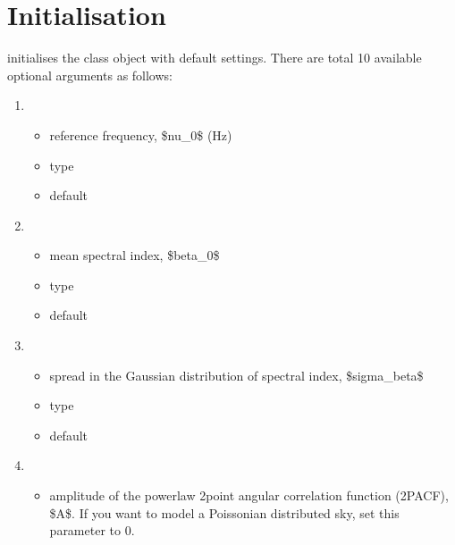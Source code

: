 \documentclass[letterpaper,10pt,english]{sphinxmanual}
\begin{document}
\section{Initialisation}
\label{\detokenize{detexp:initialisation}}
\sphinxAtStartPar
{} initialises the class object with default settings.
There are total 10 available optional arguments as follows:
\begin{enumerate}
%
\item {} 
\sphinxAtStartPar
{}
\begin{itemize}
\item {} 
\sphinxAtStartPar
reference frequency, \$nu\_0\$ (Hz)

\item {} 
\sphinxAtStartPar
type 

\item {} 
\sphinxAtStartPar
default 

\end{itemize}

\item {} 
\sphinxAtStartPar
{}
\begin{itemize}
\item {} 
\sphinxAtStartPar
mean spectral index, \$beta\_0\$

\item {} 
\sphinxAtStartPar
type 

\item {} 
\sphinxAtStartPar
default 

\end{itemize}

\item {} 
\sphinxAtStartPar
{}
\begin{itemize}
\item {} 
\sphinxAtStartPar
spread in the Gaussian distribution of spectral index,
\$sigma\_beta\$

\item {} 
\sphinxAtStartPar
type 

\item {} 
\sphinxAtStartPar
default 

\end{itemize}

\item {} 
\sphinxAtStartPar
{}
\begin{itemize}
\item {} 
\sphinxAtStartPar
amplitude of the power\sphinxhyphen{}law 2\sphinxhyphen{}point angular correlation function
(2PACF), \$A\$. If you want to model a Poissonian distributed sky,
set this parameter to 0.


\end{itemize}
\end{enumerate}
\end{document}
